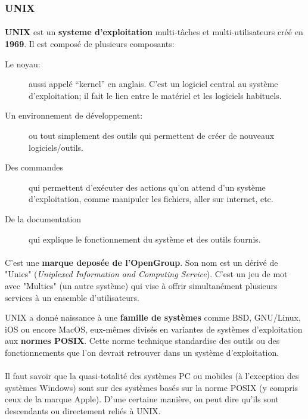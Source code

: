 \subsubsection*{UNIX}

\paragraph{} \textbf{UNIX} est un \textbf{systeme d'exploitation} multi-tâches
et multi-utilisateurs créé en \textbf{1969}. Il est composé de plusieurs
composants:

\begin{description}
	\item[Le noyau:] aussi appelé ``kernel'' en anglais. C'est un logiciel
		central au système d'exploitation; il fait le lien entre le matériel et
		les logiciels habituels.
	\item[Un environnement de développement:] ou tout simplement des outils qui
		permettent de créer de nouveaux logiciels/outils.
	\item[Des commandes] qui permettent d'exécuter des actions qu'on attend
		d'un système d'exploitation, comme manipuler les fichiers, aller sur
		internet, etc.
	\item[De la documentation] qui explique le fonctionnement du système et des
		outils fournis.
\end{description}

\paragraph{} C'est une \textbf{marque deposée de l'OpenGroup}. Son nom est un
dérivé de "Unics" (\textit{Uniplexed Information and Computing Service}). C'est
un jeu de mot avec "Multics" (un autre système) qui vise à offrir simultanément
plusieurs services à un ensemble d'utilisateurs.

UNIX a donné naissance à une \textbf{famille de systèmes} comme BSD, GNU/Linux,
iOS ou encore MacOS, eux-mêmes divisés en variantes de systèmes d'exploitation
aux \textbf{normes POSIX}. Cette norme technique standardise des outils ou des
fonctionnements que l'on devrait retrouver dans un système d'exploitation.

\paragraph{} Il faut savoir que la quasi-totalité des systèmes PC ou mobiles (à
l'exception des systèmes Windows) sont sur des systèmes basés sur la norme POSIX (y compris
ceux de la marque Apple). D'une certaine manière, on peut dire qu'ils sont
descendants ou directement reliés à UNIX.

